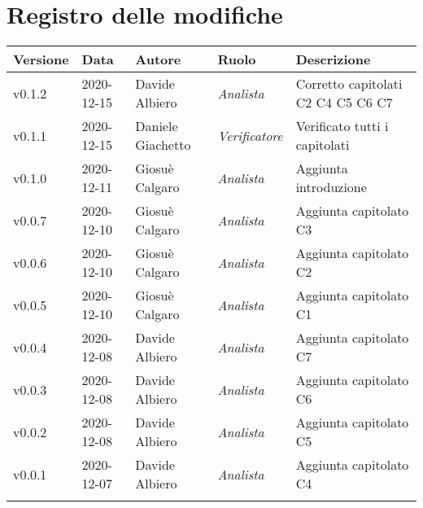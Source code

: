 \section*{\hfil Registro delle modifiche \hfil}
{
	\newlength{\freewidth}
	\setlength{\freewidth}{\dimexpr\textwidth-10\tabcolsep}
	\renewcommand{\arraystretch}{1.5}
	\centering
	\setlength{\aboverulesep}{0pt}
	\setlength{\belowrulesep}{0pt}
	\begin{longtable}{C{.131777\freewidth} C{.134036\freewidth} C{.263554\freewidth} C{.188254\freewidth} C{.282379\freewidth}}
		\toprule 
		\textbf{Versione} & \textbf{Data} & \textbf{Autore} & \textbf{Ruolo} & \textbf{Descrizione}\\
		\toprule
		\endhead

		v0.1.2 & 2020-12-15 & Davide Albiero & \textit{Analista} & Corretto capitolati C2 C4 C5 C6 C7 \\ 

		v0.1.1 & 2020-12-15 & Daniele Giachetto & \textit{Verificatore} & Verificato tutti i capitolati \\ 
		
		v0.1.0 & 2020-12-11 & Giosuè Calgaro &  \textit{Analista} & Aggiunta introduzione \\
		v0.0.7 & 2020-12-10 & Giosuè Calgaro &  \textit{Analista} & Aggiunta capitolato C3 \\
		v0.0.6 & 2020-12-10 & Giosuè Calgaro &  \textit{Analista} & Aggiunta capitolato C2 \\
		v0.0.5 & 2020-12-10 & Giosuè Calgaro &  \textit{Analista} & Aggiunta capitolato C1 \\
		v0.0.4 & 2020-12-08 & Davide Albiero &  \textit{Analista} & Aggiunta capitolato C7 \\
		v0.0.3 & 2020-12-08 & Davide Albiero &  \textit{Analista} & Aggiunta capitolato C6 \\
		v0.0.2 & 2020-12-08 & Davide Albiero &  \textit{Analista} & Aggiunta capitolato C5 \\
		v0.0.1 & 2020-12-07 & Davide Albiero &  \textit{Analista} & Aggiunta capitolato C4 \\


		\bottomrule
		\hiderowcolors
	\end{longtable}
}